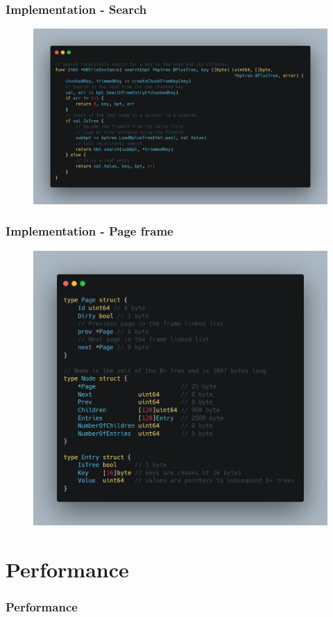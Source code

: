 \documentclass[aspectratio=169]{beamer}
\begin{document}
\begin{frame}[t]
	\frametitle{Implementation - Search}
	\begin{figure}[h!]
		\includegraphics[scale=0.18]{code_search}
	\end{figure}
	\centering
\end{frame}
\begin{frame}[t]
	\frametitle{Implementation - Page frame}
	\begin{figure}[h!]
		\includegraphics[scale=0.16]{code_page}
	\end{figure}
	\centering
\end{frame}
\section{Performance}
\begin{frame}[t]
    \frametitle{Performance}
\end{frame}
\end{document}

